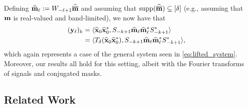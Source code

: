 Defining $\widehat{\mathbf m}_\ell := W_{-\ell+1}\widehat{\overline{\mathbf m}}$ and assuming that $\operatorname{supp}(\widehat{\overline{\mathbf m}})\subseteq [\delta]$ (e.g., assuming that $\mathbf m$ is real-valued and band-limited), we now have that
\begin{align}%
%
    (\y_\ell)_{k}   &= \langle \widehat\x_0 \widehat\x_0^*, S_{-k+1} \widehat{\m}_\ell \widehat{\m}_\ell^* S_{-k+1}^*\rangle \notag\\
   &= \langle T_\delta(\widehat\x_0 \widehat\x_0^*), S_{-k+1} \widehat{\m}_\ell \widehat{\m}_\ell^* S_{-k+1}^*\rangle, \notag
\end{align}
which again represents a case of the general system seen in \eqref{eq:lifted_system}. Moreover, our results all hold for this setting, albeit with the Fourier transforms of signals and conjugated masks.

\subsection{Related Work}
\label{sec:lit}



